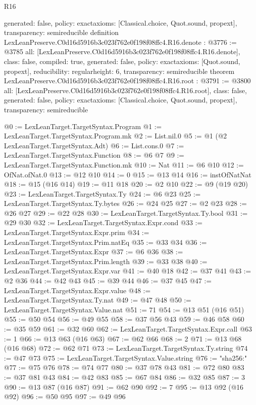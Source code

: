 \begin{lexlean}{R16}
\begin{coremodule}
{  generated: false,
  policy: exact{axioms: [Classical.choice, Quot.sound, propext]},
  transparency: semireducible
}
definition LexLeanPreserve.C0d16d5916b3c023f762e0f198f08ffc4.R16.denote : @3776 := @3785 {
  all: [LexLeanPreserve.C0d16d5916b3c023f762e0f198f08ffc4.R16.denote],
  class: false,
  compiled: true,
  generated: false,
  policy: exact{axioms: [Quot.sound, propext]},
  reducibility: regular{height: 6},
  transparency: semireducible
}
theorem LexLeanPreserve.C0d16d5916b3c023f762e0f198f08ffc4.R16.root : @3791 := @3800 {
  all: [LexLeanPreserve.C0d16d5916b3c023f762e0f198f08ffc4.R16.root],
  class: false,
  generated: false,
  policy: exact{axioms: [Classical.choice, Quot.sound, propext]},
  transparency: semireducible
}

@0 := LexLeanTarget.TargetSyntax.Program
@1 := LexLeanTarget.TargetSyntax.Program.mk
@2 := List.nil.{0}
@5 := @1 (@2 LexLeanTarget.TargetSyntax.Adt)
@6 := List.cons.{0}
@7 := LexLeanTarget.TargetSyntax.Function
@8 := @6 @7
@9 := LexLeanTarget.TargetSyntax.Function.mk
@10 := Nat
@11 := @6 @10
@12 := OfNat.ofNat.{0}
@13 := @12 @10
@14 := 0
@15 := @13 @14
@16 := instOfNatNat
@18 := @15 (@16 @14)
@19 := @11 @18
@20 := @2 @10
@22 := @9 (@19 @20)
@23 := LexLeanTarget.TargetSyntax.Ty
@24 := @6 @23
@25 := LexLeanTarget.TargetSyntax.Ty.bytes
@26 := @24 @25
@27 := @2 @23
@28 := @26 @27
@29 := @22 @28
@30 := LexLeanTarget.TargetSyntax.Ty.bool
@31 := @29 @30
@32 := LexLeanTarget.TargetSyntax.Expr.cond
@33 := LexLeanTarget.TargetSyntax.Expr.prim
@34 := LexLeanTarget.TargetSyntax.Prim.natEq
@35 := @33 @34
@36 := LexLeanTarget.TargetSyntax.Expr
@37 := @6 @36
@38 := LexLeanTarget.TargetSyntax.Prim.length
@39 := @33 @38
@40 := LexLeanTarget.TargetSyntax.Expr.var
@41 := @40 @18
@42 := @37 @41
@43 := @2 @36
@44 := @42 @43
@45 := @39 @44
@46 := @37 @45
@47 := LexLeanTarget.TargetSyntax.Expr.value
@48 := LexLeanTarget.TargetSyntax.Ty.nat
@49 := @47 @48
@50 := LexLeanTarget.TargetSyntax.Value.nat
@51 := 71
@54 := @13 @51 (@16 @51)
@55 := @50 @54
@56 := @49 @55
@58 := @37 @56 @43
@59 := @46 @58
@60 := @35 @59
@61 := @32 @60
@62 := LexLeanTarget.TargetSyntax.Expr.call
@63 := 1
@66 := @13 @63 (@16 @63)
@67 := @62 @66
@68 := 2
@71 := @13 @68 (@16 @68)
@72 := @62 @71
@73 := LexLeanTarget.TargetSyntax.Ty.string
@74 := @47 @73
@75 := LexLeanTarget.TargetSyntax.Value.string
@76 := "sha256:"
@77 := @75 @76
@78 := @74 @77
@80 := @37 @78 @43
@81 := @72 @80
@83 := @37 @81 @43
@84 := @42 @83
@85 := @67 @84
@86 := @32 @85
@87 := 3
@90 := @13 @87 (@16 @87)
@91 := @62 @90
@92 := 7
@95 := @13 @92 (@16 @92)
@96 := @50 @95
@97 := @49 @96

\end{coremodule}
\end{lexlean}
